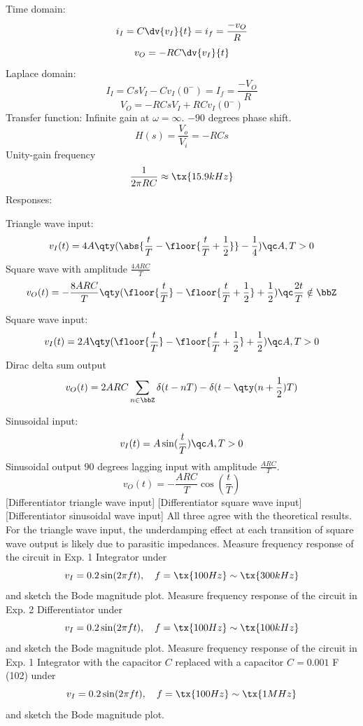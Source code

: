 \documentclass[a4paper,12pt]{article}
\begin{document}
Time domain:
\[i_I=C\dv{v_I}{t}=i_f=\frac{-v_O}{R}\]
\[v_O=-RC\dv{v_I}{t}\]
Laplace domain:
\[I_I=CsV_I-Cv_I(0^-)=I_f=\frac{-V_O}{R}\]
\[V_O=-RCsV_I+RCv_I(0^-)\]
Transfer function: Infinite gain at $\omega=\infty$. $-90$ degrees phase shift.
\[H(s)=\frac{V_o}{V_i}=-RCs\]
Unity-gain frequency
\[\frac{1}{2\pi RC}\approx\tx{15.9 kHz}\]
Responses:
\bit
\item Triangle wave input:
\[v_I(t)=4A\qty(\abs{\frac{t}{T}-\floor{\frac{t}{T}+\frac{1}{2}}}-\frac{1}{4})\qc A,T>0\]
Square wave with amplitude $\frac{4ARC}{T}$
\[v_O(t)=-\frac{8ARC}{T}\qty(\floor{\frac{t}{T}}-\floor{\frac{t}{T}+\frac{1}{2}}+\frac{1}{2})\qc\frac{2t}{T}\notin\bbZ\]
\item Square wave input:
\[v_I(t)=2A\qty(\floor{\frac{t}{T}}-\floor{\frac{t}{T}+\frac{1}{2}}+\frac{1}{2})\qc A,T>0\]
Dirac delta sum output
\[v_O(t)=2ARC\sum_{n\in\bbZ}\delta(t-nT)-\delta(t-\qty(n+\frac{1}{2})T)\]
\item Sinusoidal input:
\[v_I(t)=A\sin(\frac{t}{T})\qc A,T>0\]
Sinusoidal output 90 degrees lagging input with amplitude $\frac{ARC}{T}$.
\[v_O(t)=-\frac{ARC}{T}\cos(\frac{t}{T})\]
\eit
{}
[Differentiator triangle wave input]
[Differentiator square wave input]
[Differentiator sinusoidal wave input]
All three agree with the theoretical results. For the triangle wave input, the underdamping effect at each transition of square wave output is likely due to parasitic impedances.
Measure frequency response of the circuit in Exp. 1 Integrator under
\[v_I=0.2\sin(2\pi ft),\quad f=\tx{100 Hz}\sim\tx{300 kHz}\]
and sketch the Bode magnitude plot.
Measure frequency response of the circuit in Exp. 2 Differentiator under
\[v_I=0.2\sin(2\pi ft),\quad f=\tx{100 Hz}\sim\tx{100 kHz}\]
and sketch the Bode magnitude plot.
Measure frequency response of the circuit in Exp. 1 Integrator with the capacitor $C$ replaced with a capacitor $C=0.001$ \textmu{}F (102) under
\[v_I=0.2\sin(2\pi ft),\quad f=\tx{100 Hz}\sim\tx{1 MHz}\]
and sketch the Bode magnitude plot.
\end{document}
